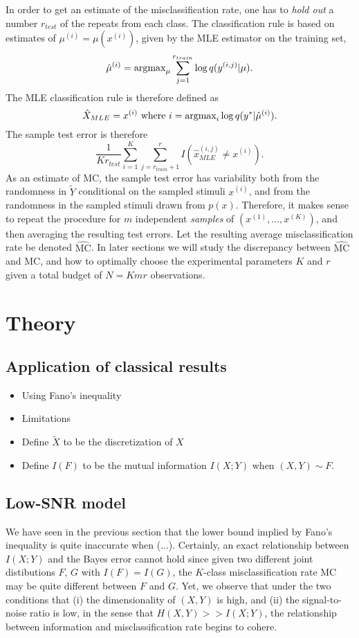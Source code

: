 \documentclass[12pt]{article}
\begin{document}
In order to get an estimate of the misclassification rate, one
has to \emph{hold out} a number $r_{test}$ of the repeats from each class.
The classification rule is based on estimates of $\mu^{(i)}
= \mu(x^{(i)})$, given by the MLE estimator on the training set,
\[
\hat{\mu}^{(i)} = \text{argmax}_\mu \sum_{j=1}^{r_{train}} \log q(y^{(i, j)}|\mu).
\]
The MLE classification rule is therefore defined as
\[
\hat{X}_{MLE} = x^{(i)} \text{ where }i = \text{argmax}_i  \log q(y^*|\hat{\mu}^{(i)}).
\]
The sample test error is therefore
\[
\frac{1}{K r_{test}} \sum_{i=1}^K \sum_{j=r_{train}+1}^r I(\hat{x}_{MLE}^{(i,j)} \neq x^{(i)}).
\] 
As an estimate of $\text{MC}$, the sample test error has variability
both from the randomness in $\tilde{Y}$ conditional on the sampled
stimuli $x^{(i)}$, and from the randomness in the sampled stimuli
drawn from $p(x)$.  Therefore, it makes sense to repeat the procedure
for $m$ independent \emph{samples} of $(x^{(1)},\hdots, x^{(K)})$, and
then averaging the resulting test errors.  Let the resulting average
misclassification rate be denoted $\hat{\text{MC}}$.  In later
sections we will study the discrepancy between $\hat{\text{MC}}$ and
$\text{MC}$, and how to optimally choose the experimental parameters
$K$ and $r$ given a total budget of $N = Kmr$ observations.



\section{Theory}

\subsection{Application of classical results}

\begin{itemize}
\item Using Fano's inequality
\item Limitations
\item Define $\tilde{X}$ to be the discretization of $X$
\item Define $I(F)$ to be the mutual information $I(X;Y)$ when $(X, Y) \sim F$.
\end{itemize}

\subsection{Low-SNR model}

We have seen in the previous section that the lower bound implied by
Fano's inequality is quite inaccurate when (...).  Certainly, an exact
relationship between $I(X;Y)$ and the Bayes error cannot hold since
given two different joint distibutions $F$, $G$ with $I(F) = I(G)$,
the $K$-class misclassification rate $\text{MC}$ may be quite
different between $F$ and $G$.  Yet, we observe that under the two
conditions that (i) the dimensionality of $(X,Y)$ is high, and (ii)
the signal-to-noise ratio is low, in the sense that $H(X, Y) >>
I(X;Y)$, the relationship between information and misclassification
rate begins to cohere.
\end{document}
